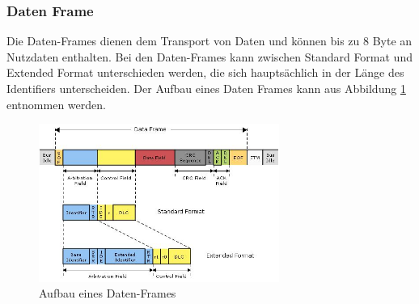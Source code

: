 	\subsubsection{Daten Frame}
	Die Daten-Frames dienen dem Transport von Daten und können bis zu 8 Byte an Nutzdaten enthalten. Bei den Daten-Frames kann zwischen Standard Format und Extended Format unterschieden werden, die sich hauptsächlich in der Länge des Identifiers unterscheiden. Der Aufbau eines Daten Frames kann aus Abbildung \ref{data} entnommen werden.
	
	\begin{figure}[h]
		\centering
		\includegraphics[width=0.7\textwidth]{figures/data-frame}
		\caption{Aufbau eines Daten-Frames}
		\label{data}
	\end{figure}
		
